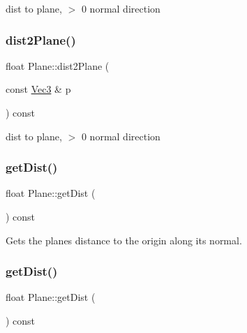 dist to plane, $>$ 0 normal direction \mbox{\label{classPlane_a7e5bcf2d7ae8efe45753d782944a618a}} 
\subsubsection{\texorpdfstring{dist2\+Plane()}{dist2Plane()}\hspace{0.1cm}{\footnotesize\ttfamily [2/2]}}
{\footnotesize\ttfamily float Plane\+::dist2\+Plane (\begin{DoxyParamCaption}\item[{const \hyperlink{classVec3}{Vec3} \&}]{p }\end{DoxyParamCaption}) const}

dist to plane, $>$ 0 normal direction \mbox{\label{classPlane_a7e8852aacb0d642999c6836d949d815f}} 
\subsubsection{\texorpdfstring{get\+Dist()}{getDist()}\hspace{0.1cm}{\footnotesize\ttfamily [1/2]}}
{\footnotesize\ttfamily float Plane\+::get\+Dist (\begin{DoxyParamCaption}{ }\end{DoxyParamCaption}) const\hspace{0.3cm}{\ttfamily [inline]}}

Gets the plane\textquotesingle{}s distance to the origin along its normal. \mbox{\label{classPlane_a7e8852aacb0d642999c6836d949d815f}} 
\subsubsection{\texorpdfstring{get\+Dist()}{getDist()}\hspace{0.1cm}{\footnotesize\ttfamily [2/2]}}
{\footnotesize\ttfamily float Plane\+::get\+Dist (\begin{DoxyParamCaption}{ }\end{DoxyParamCaption}) const\hspace{0.3cm}{\ttfamily [inline]}}

